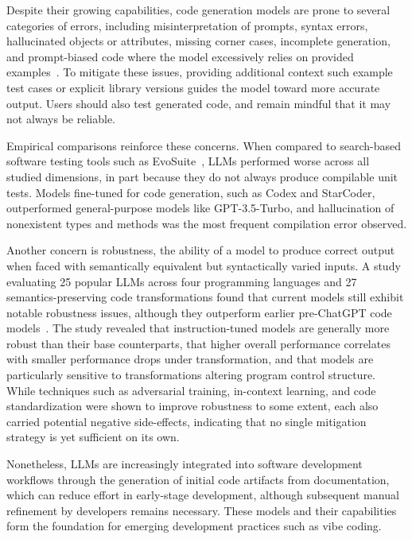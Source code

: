 \documentclass[
english,                 %
bibtex,                  %
includeExtraAbstracts, %
]{kththesis}
\numberwithin{listing}{chapter}
\begin{document}
Despite their growing capabilities, code generation models are prone to several categories of errors, including misinterpretation of prompts, syntax errors, hallucinated objects or attributes, missing corner cases, incomplete generation, and prompt-biased code where the model excessively relies on provided examples~\cite{tambon_bugs_2025}. To mitigate these issues, providing additional context such example test cases or explicit library versions guides the model toward more accurate output. Users should also test generated code, and remain mindful that it may not always be reliable.

Empirical comparisons reinforce these concerns. When compared to search-based software testing tools such as EvoSuite~\cite{siddiq_using_2024}, \glspl{LLM} performed worse across all studied dimensions, in part because they do not always produce compilable unit tests. Models fine-tuned for code generation, such as Codex and StarCoder, outperformed general-purpose models like \gls{GPT}-3.5-Turbo, and hallucination of nonexistent types and methods was the most frequent compilation error observed.

Another concern is robustness, the ability of a model to produce correct output when faced with semantically equivalent but syntactically varied inputs. A study evaluating 25 popular \glspl{LLM} across four programming languages and 27 semantics-preserving code transformations found that current models still exhibit notable robustness issues, although they outperform earlier pre-Chat\gls{GPT} code models~\cite{liu_robustness_2026}. The study revealed that instruction-tuned models are generally more robust than their base counterparts, that higher overall performance correlates with smaller performance drops under transformation, and that models are particularly sensitive to transformations altering program control structure. While techniques such as adversarial training, in-context learning, and code standardization were shown to improve robustness to some extent, each also carried potential negative side-effects, indicating that no single mitigation strategy is yet sufficient on its own.

Nonetheless, \glspl{LLM} are increasingly integrated into software development workflows through the generation of initial code artifacts from documentation, which can reduce effort in early-stage development, although subsequent manual refinement by developers remains necessary. These models and their capabilities form the foundation for emerging development practices such as vibe coding.
\end{document}
